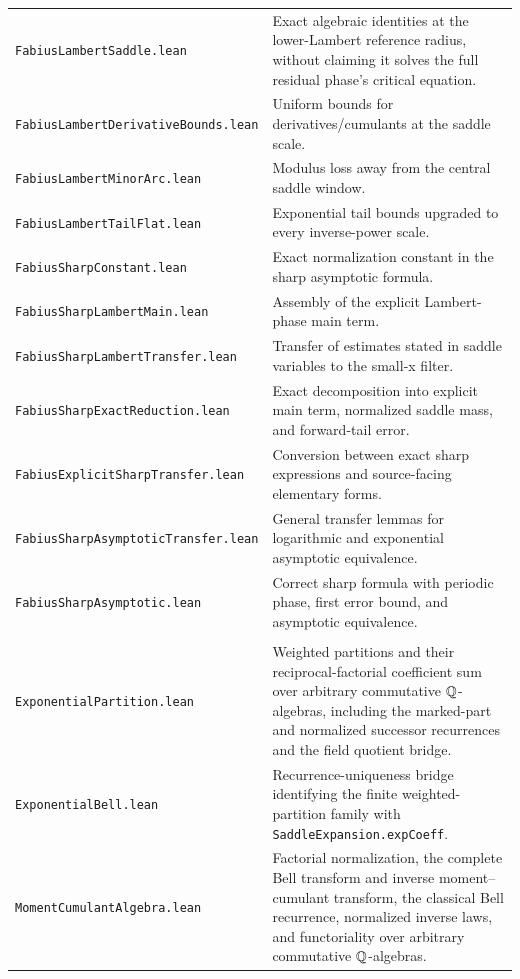 \documentclass[11pt,oneside]{article}
\theoremstyle{definition}
\theoremstyle{remark}
\begin{document}
\begin{longtable}{>{\raggedright\arraybackslash}p{} >{\raggedright\arraybackslash}p{}}
\nolinkurl{FabiusLambertSaddle.lean} & Exact algebraic identities at the lower-Lambert reference radius, without claiming it solves the full residual phase's critical equation. \\
\nolinkurl{FabiusLambertDerivativeBounds.lean} & Uniform bounds for derivatives/cumulants at the saddle scale. \\
\nolinkurl{FabiusLambertMinorArc.lean} & Modulus loss away from the central saddle window. \\
\nolinkurl{FabiusLambertTailFlat.lean} & Exponential tail bounds upgraded to every inverse-power scale. \\
\nolinkurl{FabiusSharpConstant.lean} & Exact normalization constant in the sharp asymptotic formula. \\
\nolinkurl{FabiusSharpLambertMain.lean} & Assembly of the explicit Lambert-phase main term. \\
\nolinkurl{FabiusSharpLambertTransfer.lean} & Transfer of estimates stated in saddle variables to the small-x filter. \\
\nolinkurl{FabiusSharpExactReduction.lean} & Exact decomposition into explicit main term, normalized saddle mass, and forward-tail error. \\
\nolinkurl{FabiusExplicitSharpTransfer.lean} & Conversion between exact sharp expressions and source-facing elementary forms. \\
\nolinkurl{FabiusSharpAsymptoticTransfer.lean} & General transfer lemmas for logarithmic and exponential asymptotic equivalence. \\
\nolinkurl{FabiusSharpAsymptotic.lean} & Correct sharp formula with periodic phase, first error bound, and asymptotic equivalence. \\
\addlinespace[0.45em]
\multicolumn{2}{l}{\textbf{Post-snapshot algebra and phase-extraction machinery}}\\[0.25em]
\nolinkurl{ExponentialPartition.lean} & Weighted partitions and their reciprocal-factorial coefficient sum over arbitrary commutative \(\mathbb{Q}\)-algebras, including the marked-part and normalized successor recurrences and the field quotient bridge. \\
\nolinkurl{ExponentialBell.lean} & Recurrence-uniqueness bridge identifying the finite weighted-partition family with \nolinkurl{SaddleExpansion.expCoeff}. \\
\nolinkurl{MomentCumulantAlgebra.lean} & Factorial normalization, the complete Bell transform and inverse moment--cumulant transform, the classical Bell recurrence, normalized inverse laws, and functoriality over arbitrary commutative \(\mathbb{Q}\)-algebras. \\

\end{longtable}
\end{document}
